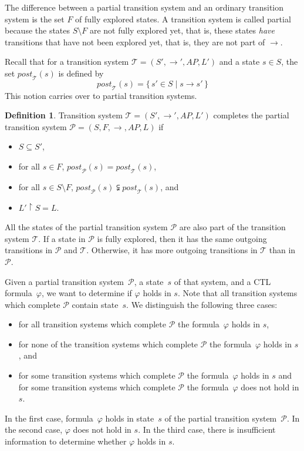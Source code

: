 \documentclass[12pt]{article}
\theoremstyle{definition}
\newtheorem{definition}{Definition}
\begin{document}
The difference between a partial transition system and an ordinary transition system is the set $F$ of fully explored states.  A transition system is called partial because the states $S \setminus F$ are not fully explored yet, that is, these states \emph{have} transitions that have not been explored yet, that is, they are not part of $\rightarrow$.

Recall that for a transition system $\mathcal{T} = (S', \rightarrow', \mathit{AP}, L')$ and a state $s \in S$, the set $\mathit{post}_{\mathcal{T}}(s)$ is defined by
\[
\mathit{post}_{\mathcal{T}}(s) = \{\, s' \in S \mid s \rightarrow s' \,\}
\]
This notion carries over to partial transition systems.

\begin{definition}
Transition system $\mathcal{T} = (S', \rightarrow', \mathit{AP}, L')$ completes the partial transition system $\mathcal{P} = (S, F, \rightarrow, \mathit{AP}, L)$ if
\begin{itemize}
\item 
$S \subseteq S'$,
\item
for all $s \in F$, $\mathit{post}_{\mathcal{P}}(s) = \mathit{post}_{\mathcal{T}}(s)$,
\item
for all $s \in S \setminus F$,  $\mathit{post}_{\mathcal{P}}(s) \subsetneqq \mathit{post}_{\mathcal{T}}(s)$, and
\item
$L' \restriction S = L$.
\end{itemize}
\end{definition}

All the states of the partial transition system $\mathcal{P}$ are also part of the transition system $\mathcal{T}$.  If a state in $\mathcal{P}$ is fully explored, then it has the same outgoing transitions in $\mathcal{P}$ and $\mathcal{T}$.  Otherwise, it has more outgoing transitions in $\mathcal{T}$ than in $\mathcal{P}$.

Given a partial transition system~$\mathcal{P}$, a state~$s$ of that system, and a CTL formula~$\varphi$, we want to determine if $\varphi$ holds in $s$.  Note that all transition systems which complete $\mathcal{P}$ contain state~$s$.  We distinguish the following three cases:
\begin{itemize}
\item
for all transition systems which complete $\mathcal{P}$ the formula~$\varphi$ holds in $s$, 
\item
for none of the transition systems which complete $\mathcal{P}$ the formula~$\varphi$ holds in $s$, and
\item
for some transition systems which complete $\mathcal{P}$ the formula~$\varphi$ holds in $s$ and for some transition systems which complete $\mathcal{P}$ the formula~$\varphi$ does not hold in $s$.
\end{itemize}
In the first case, formula~$\varphi$ holds in state~$s$ of the partial transition system~$\mathcal{P}$.  In the second case, $\varphi$ does not hold in $s$.  In the third case, there is insufficient information to determine whether $\varphi$ holds in $s$.
\end{document}
